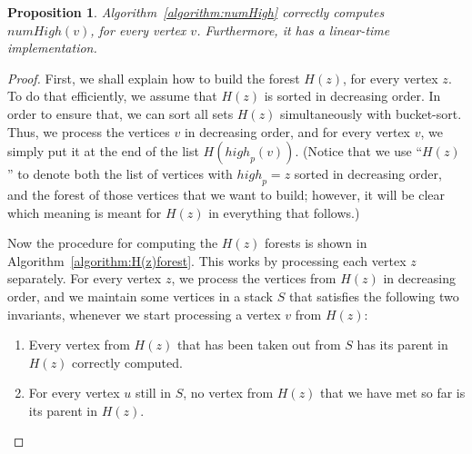 \documentclass[11pt,a4paper]{article}
\newtheorem{proposition}[theorem]{Proposition}
\begin{document}
\begin{proposition}
Algorithm~\ref{algorithm:numHigh} correctly computes $\mathit{numHigh}(v)$, for every vertex $v$. Furthermore, it has a linear-time implementation.
\end{proposition}
\begin{proof}
First, we shall explain how to build the forest $H(z)$, for every vertex $z$. To do that efficiently, we assume that $H(z)$ is sorted in decreasing order. In order to ensure that, we can sort all sets $H(z)$ simultaneously with bucket-sort. Thus, we process the vertices $v$ in decreasing order, and for every vertex $v$, we simply put it at the end of the list $H(\mathit{high}_p(v))$. (Notice that we use ``$H(z)$'' to denote both the list of vertices with $\mathit{high}_p=z$ sorted in decreasing order, and the forest of those vertices that we want to build; however, it will be clear which meaning is meant for $H(z)$ in everything that follows.)

Now the procedure for computing the $H(z)$ forests is shown in Algorithm~\ref{algorithm:H(z)forest}. This works by processing each vertex $z$ separately. For every vertex $z$, we process the vertices from $H(z)$ in decreasing order, and we maintain some vertices in a stack $S$ that satisfies the following two invariants, whenever we start processing a vertex $v$ from $H(z)$:

\begin{enumerate}[label={(\arabic*)}]
\item{Every vertex from $H(z)$ that has been taken out from $S$ has its parent in $H(z)$ correctly computed.}
\item{For every vertex $u$ still in $S$, no vertex from $H(z)$ that we have met so far is its parent in $H(z)$.}
\end{enumerate}


\end{proof}
\end{document}
